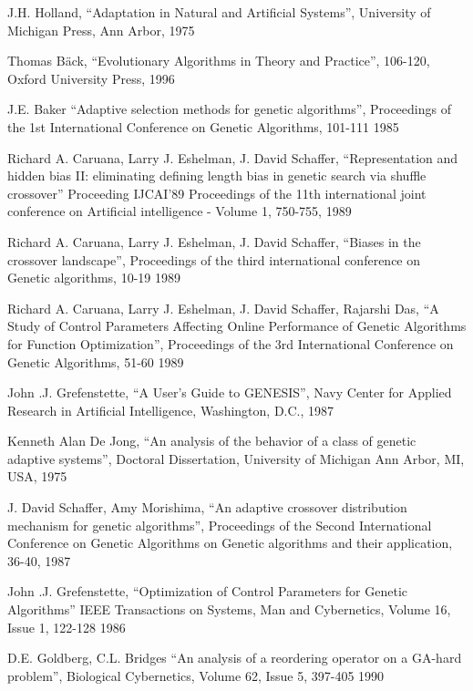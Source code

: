 \documentclass[bsc,en,
oneside,12pt,utf8,a4paper,
]{thesisdifctunl}
\begin{document}
\begin{thebibliography}{9}
	J.H. Holland,
	"`Adaptation in Natural and Artificial Systems"',
	University of Michigan Press,
	Ann Arbor, 
	1975
	
	Thomas Bäck,
	"`Evolutionary Algorithms in Theory and Practice"', 106-120,
	Oxford University Press,
	1996
	
	J.E. Baker
	"`Adaptive selection methods for genetic algorithms"',
	Proceedings of the 1st International Conference on Genetic Algorithms, 101-111
	1985
	
	Richard A. Caruana, Larry J. Eshelman, J. David Schaffer,
	"`Representation and hidden bias II: eliminating defining length bias in genetic search via shuffle crossover"'
	Proceeding IJCAI'89 Proceedings of the 11th international joint conference on Artificial intelligence - Volume 1, 750-755,
	1989
	
	Richard A. Caruana, Larry J. Eshelman, J. David Schaffer,
	"`Biases in the crossover landscape"',
	Proceedings of the third international conference on Genetic algorithms, 10-19
	1989
	
	Richard A. Caruana, Larry J. Eshelman, J. David Schaffer, Rajarshi Das,
	"`A Study of Control Parameters Affecting Online Performance of Genetic Algorithms for Function Optimization"',
	Proceedings of the 3rd International Conference on Genetic Algorithms, 51-60
	1989
	
	John .J. Grefenstette,
	"`A User's Guide to GENESIS"',
	Navy Center for Applied Research in Artificial Intelligence,
	Washington, D.C.,
	1987
	
	Kenneth Alan De Jong,
	"`An analysis of the behavior of a class of genetic adaptive systems"',
	Doctoral Dissertation, 
	University of Michigan Ann Arbor, MI, USA,
	1975 
	
	J. David Schaffer,	Amy Morishima,
	"`An adaptive crossover distribution mechanism for genetic algorithms"',
	Proceedings of the Second International Conference on Genetic Algorithms on Genetic algorithms and their application, 36-40,
	1987

	John .J. Grefenstette,
	"`Optimization of Control Parameters for Genetic Algorithms"'
	IEEE Transactions on Systems, Man and Cybernetics, Volume 16, Issue 1, 122-128
	1986
	
	D.E. Goldberg, C.L. Bridges
	"`An analysis of a reordering operator on a GA-hard problem"',
	Biological Cybernetics, Volume 62, Issue 5, 397-405
	1990
	

\end{thebibliography}
\end{document}
